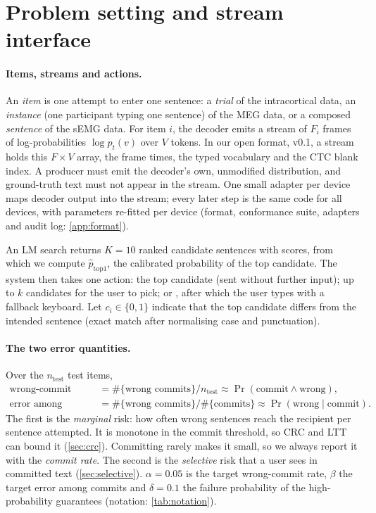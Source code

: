 \section{Problem setting and stream interface}
\label{sec:setting}
\label{sec:format}

\paragraph{Items, streams and actions.} An \emph{item} is one attempt to enter one sentence: a \emph{trial} of the intracortical data, an \emph{instance} (one participant typing one sentence) of the MEG data, or a composed \emph{sentence} of the sEMG data. For item $i$, the decoder emits a stream of $F_i$ frames of log-probabilities $\log p_t(v)$ over $V$ tokens. In our open format, \nts{} v0.1, a stream holds this $F \times V$ array, the frame times, the typed vocabulary and the CTC blank index. A producer must emit the decoder's own, unmodified distribution, and ground-truth text must not appear in the stream. One small adapter per device maps decoder output into the stream; every later step is the same code for all devices, with parameters re-fitted per device (format, conformance suite, adapters and audit log: \cref{app:format}).

An LM search returns $K = 10$ ranked candidate sentences with scores, from which we compute $\hat p_{\mathrm{top1}}$, the calibrated probability of the top candidate. The system then takes one action:  the top candidate (sent without further input);  up to $k$ candidates for the user to pick; or , after which the user types with a fallback keyboard. Let $c_i \in \{0,1\}$ indicate that the top candidate differs from the intended sentence (exact match after normalising case and punctuation).

\paragraph{The two error quantities.} Over the $n_{\mathrm{test}}$ test items,
\begin{align}
  \text{wrong-commit rate} &= \#\{\text{wrong commits}\} / n_{\mathrm{test}} \approx \Pr(\text{commit} \wedge \text{wrong}), \\
  \text{error among commits (EAC)} &= \#\{\text{wrong commits}\} / \#\{\text{commits}\} \approx \Pr(\text{wrong} \mid \text{commit}).
\end{align}
The first is the \emph{marginal} risk: how often wrong sentences reach the recipient per sentence attempted. It is monotone in the commit threshold, so CRC and LTT can bound it (\cref{sec:crc}). Committing rarely makes it small, so we always report it with the \emph{commit rate}. The second is the \emph{selective} risk that a user sees in committed text (\cref{sec:selective}). $\alpha = 0.05$ is the target wrong-commit rate, $\beta$ the target error among commits and $\delta = 0.1$ the failure probability of the high-probability guarantees (notation: \cref{tab:notation}).
